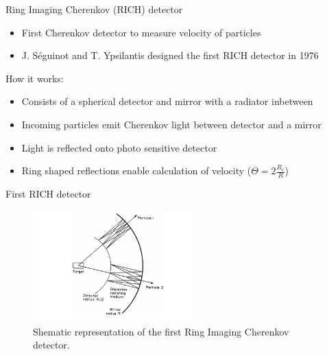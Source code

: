 \documentclass[aspectratio=1610, 10pt]{beamer}
\begin{document}
\begin{frame}{Ring Imaging Cherenkov (RICH) detector}
  \begin{itemize}
    \item First Cherenkov detector to measure velocity of particles
    \medskip
    \item J. S\'{e}guinot and T. Ypsilantis designed the first RICH detector in 1976
  \end{itemize}
\vspace{0.5cm}
How it works:
\begin{itemize}
  \item Consists of a spherical detector and mirror with a radiator inbetween
  \medskip
  \item Incoming particles emit Cherenkov light between detector and a mirror
  \medskip
  \item Light is reflected onto photo sensitive detector
  \medskip
  \item Ring shaped reflections enable calculation of velocity ($\Theta = 2 \frac{R_c}{R}$)
\end{itemize}
\end{frame}

\begin{frame}{First RICH detector}
  \begin{figure}
    \includegraphics[width=0.55\textwidth]{images/rich.png}
    \caption{Shematic representation of the first Ring Imaging Cherenkov detector.}
  \end{figure}
\end{frame}
\end{document}
